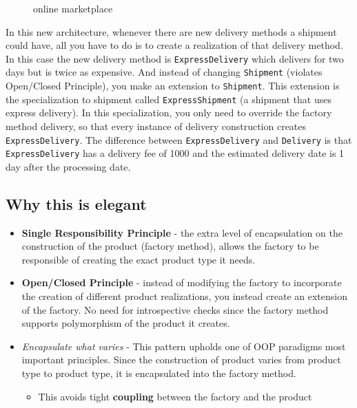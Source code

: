 \begin{figure}
\centering
{}
\caption{online marketplace}
\end{figure}

In this new architecture, whenever there are new delivery methods a
shipment could have, all you have to do is to create a realization of
that delivery method. In this case the new delivery method is
\texttt{ExpressDelivery} which delivers for two days but is twice as
expensive. And instead of changing \texttt{Shipment} (violates
Open/Closed Principle), you make an extension to \texttt{Shipment}. This
extension is the specialization to shipment called
\texttt{ExpressShipment} (a shipment that uses express delivery). In
this specialization, you only need to override the factory method
delivery, so that every instance of delivery construction creates
\texttt{ExpressDelivery}. The difference between
\texttt{ExpressDelivery} and \texttt{Delivery} is that
\texttt{ExpressDelivery} has a delivery fee of 1000 and the estimated
delivery date is 1 day after the processing date.

\subsection{Why this is
elegant}\label{creational-patterns.md__why-this-is-elegant}

\begin{itemize}
\tightlist
\item
  \textbf{Single Responsibility Principle} - the extra level of
  encapsulation on the construction of the product (factory method),
  allows the factory to be responsible of creating the exact product
  type it needs.
\item
  \textbf{Open/Closed Principle} - instead of modifying the factory to
  incorporate the creation of different product realizations, you
  instead create an extension of the factory. No need for introspective
  checks since the factory method supports polymorphism of the product
  it creates.
\item
  \emph{Encapsulate what varies} - This pattern upholds one of OOP
  paradigms most important principles. Since the construction of product
  varies from product type to product type, it is encapsulated into the
  factory method.

  \begin{itemize}
  \tightlist
  \item
    This avoids tight \textbf{coupling} between the factory and the
    product
  \end{itemize}
\end{itemize}

